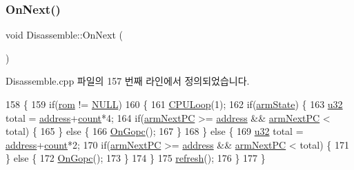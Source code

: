 \subsubsection{\texorpdfstring{On\+Next()}{OnNext()}}
{\footnotesize\ttfamily void Disassemble\+::\+On\+Next (\begin{DoxyParamCaption}{ }\end{DoxyParamCaption})\hspace{0.3cm}{\ttfamily [protected]}}



Disassemble.\+cpp 파일의 157 번째 라인에서 정의되었습니다.


\begin{DoxyCode}
158 \{
159   \textcolor{keywordflow}{if}(\mbox{\hyperlink{_globals_8cpp_adafc6ed627110c42f3893c9783f55320}{rom}} != \mbox{\hyperlink{getopt1_8c_a070d2ce7b6bb7e5c05602aa8c308d0c4}{NULL}})
160   \{
161   \mbox{\hyperlink{_g_b_a_8cpp_a4b7cf35cc5b9d6e9a65dad93a9a0d918}{CPULoop}}(1);
162   \textcolor{keywordflow}{if}(\mbox{\hyperlink{_g_b_a_8h_adeb5542a7f7ef80090a22d0133606250}{armState}}) \{
163     \mbox{\hyperlink{_system_8h_a10e94b422ef0c20dcdec20d31a1f5049}{u32}} total = \mbox{\hyperlink{class_disassemble_a960ac8317ada7182e59132a3ee4afb48}{address}}+\mbox{\hyperlink{class_disassemble_a06c362364d2e01bac10fbcfb7ab28f50}{count}}*4;
164     \textcolor{keywordflow}{if}(\mbox{\hyperlink{arm-new_8h_a7e8bf67a6667274a53fc092b97961ca4}{armNextPC}} >= \mbox{\hyperlink{class_disassemble_a960ac8317ada7182e59132a3ee4afb48}{address}} && \mbox{\hyperlink{arm-new_8h_a7e8bf67a6667274a53fc092b97961ca4}{armNextPC}} < total) \{
165     \} \textcolor{keywordflow}{else} \{
166       \mbox{\hyperlink{class_disassemble_ad757b7defc104599f1a20730cf7f3d63}{OnGopc}}();
167     \}
168   \} \textcolor{keywordflow}{else} \{
169     \mbox{\hyperlink{_system_8h_a10e94b422ef0c20dcdec20d31a1f5049}{u32}} total = \mbox{\hyperlink{class_disassemble_a960ac8317ada7182e59132a3ee4afb48}{address}}+\mbox{\hyperlink{class_disassemble_a06c362364d2e01bac10fbcfb7ab28f50}{count}}*2;
170     \textcolor{keywordflow}{if}(\mbox{\hyperlink{arm-new_8h_a7e8bf67a6667274a53fc092b97961ca4}{armNextPC}} >= \mbox{\hyperlink{class_disassemble_a960ac8317ada7182e59132a3ee4afb48}{address}} && \mbox{\hyperlink{arm-new_8h_a7e8bf67a6667274a53fc092b97961ca4}{armNextPC}} < total) \{
171     \} \textcolor{keywordflow}{else} \{
172       \mbox{\hyperlink{class_disassemble_ad757b7defc104599f1a20730cf7f3d63}{OnGopc}}();
173     \}
174   \}
175   \mbox{\hyperlink{class_disassemble_a7cdf11d53ce0f170ad7dd8fc66961805}{refresh}}();
176   \}
177 \}
\end{DoxyCode}
